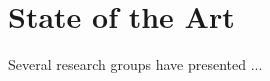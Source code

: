 \chapter{State of the Art}
\label{ch:SOTA}

Several research groups \cite{frankl:1959}\cite{postman:2005} have presented ...